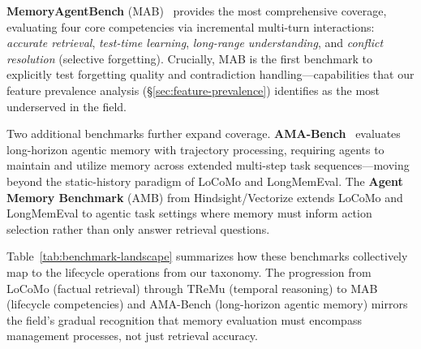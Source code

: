 \textbf{MemoryAgentBench} (MAB)~\cite{hu2025mab} provides the most
comprehensive coverage, evaluating four core competencies via
incremental multi-turn interactions: \emph{accurate retrieval},
\emph{test-time learning}, \emph{long-range understanding}, and
\emph{conflict resolution} (selective forgetting).  Crucially, MAB is
the first benchmark to explicitly test forgetting quality and
contradiction handling---capabilities that our feature prevalence
analysis (\S\ref{sec:feature-prevalence}) identifies as the most
underserved in the field.

Two additional benchmarks further expand coverage.
\textbf{AMA-Bench}~\cite{amabench2026} evaluates long-horizon agentic
memory with trajectory processing, requiring agents to maintain and
utilize memory across extended multi-step task sequences---moving beyond
the static-history paradigm of LoCoMo and LongMemEval. The
\textbf{Agent Memory Benchmark} (AMB) from Hindsight/Vectorize extends
LoCoMo and LongMemEval to agentic task settings where memory must inform
action selection rather than only answer retrieval questions.

Table~\ref{tab:benchmark-landscape} summarizes how these benchmarks
collectively map to the lifecycle operations from our taxonomy.  The
progression from LoCoMo (factual retrieval) through TReMu (temporal
reasoning) to MAB (lifecycle competencies) and AMA-Bench (long-horizon
agentic memory) mirrors the field's gradual recognition that memory
evaluation must encompass management processes, not just retrieval
accuracy.

